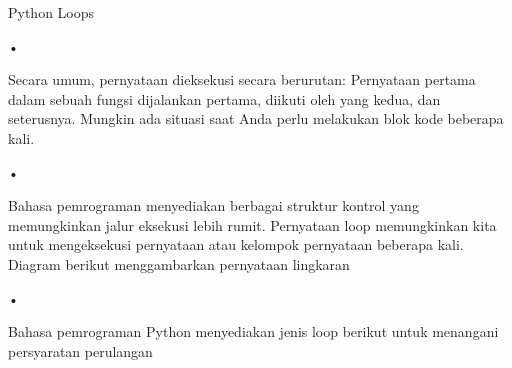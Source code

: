 Python Loops
\begin{flushleft}
•
\end{flushleft}Secara umum, pernyataan dieksekusi secara berurutan: Pernyataan pertama dalam sebuah fungsi dijalankan pertama, diikuti oleh yang kedua, dan seterusnya. Mungkin ada situasi saat Anda perlu melakukan blok kode beberapa kali.
\begin{flushleft}
•
\end{flushleft}Bahasa pemrograman menyediakan berbagai struktur kontrol yang memungkinkan jalur eksekusi lebih rumit.
Pernyataan loop memungkinkan kita untuk mengeksekusi pernyataan atau kelompok pernyataan beberapa kali. Diagram berikut menggambarkan pernyataan lingkaran 
\begin{flushleft}
•
\end{flushleft}Bahasa pemrograman Python menyediakan jenis loop berikut untuk menangani persyaratan perulangan

